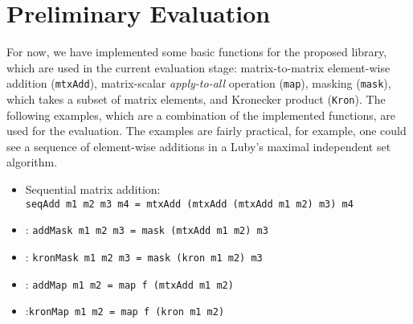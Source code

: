 \section{Preliminary Evaluation}

For now, we have implemented some basic functions for the proposed library, which are used in the current evaluation stage: matrix-to-matrix element-wise addition (\verb|mtxAdd|),
matrix-scalar \emph{apply-to-all} operation (\verb|map|),
masking (\verb|mask|), which takes a subset of matrix elements, and Kronecker product (\verb|Kron|).
The following examples, which are a combination of the implemented functions, are used for the evaluation. 
The examples are fairly practical, for example, one could see a sequence of element-wise additions in a Luby's maximal independent set algorithm.

\begin{itemize}
\item Sequential matrix addition:\\
  \verb|seqAdd m1 m2 m3 m4 = mtxAdd (mtxAdd (mtxAdd m1 m2) m3) m4|
\item {}: \verb|addMask m1 m2 m3 = mask (mtxAdd m1 m2) m3|
\item {}: \verb|kronMask m1 m2 m3 = mask (kron m1 m2) m3 |  
\item {}: \verb|addMap m1 m2 = map f (mtxAdd m1 m2)|  
\item {}:\verb|kronMap m1 m2 = map f (kron m1 m2)|  
\end{itemize}

